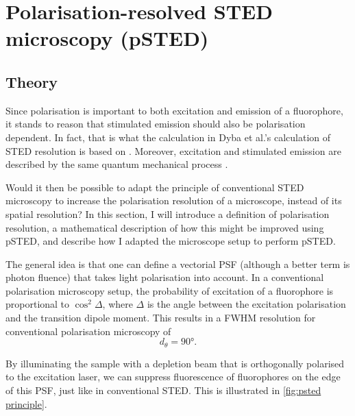 \section{Polarisation-resolved STED microscopy (pSTED)}
\subsection{Theory}
\label{sec:psted theory}

Since polarisation is important to both excitation and emission of a fluorophore, it stands to reason that stimulated emission should also be polarisation dependent. In fact, that is what the calculation in Dyba et al.'s calculation of STED resolution is based on \cite{Harke2008, Dyba2005}. Moreover, excitation and stimulated emission are described by the same quantum mechanical process \cite{Foot}.

Would it then be possible to adapt the principle of conventional STED microscopy to increase the polarisation resolution of a microscope, instead of its spatial resolution? In this section, I will introduce a definition of polarisation resolution, a mathematical description of how this might be improved using pSTED, and describe how I adapted the microscope setup to perform pSTED. 

The general idea is that one can define a vectorial PSF (although a better term is photon fluence) that takes light polarisation into account. In a conventional polarisation microscopy setup, the probability of excitation of a fluorophore is proportional to $ \cos^2 \Delta $, where $ \Delta $ is the angle between the excitation polarisation and the transition dipole moment. This results in a FWHM resolution for conventional polarisation microscopy of 
\begin{equation}
	d_\theta = \ang{90}.
\end{equation}

By illuminating the sample with a depletion beam that is orthogonally polarised to the excitation laser, we can suppress fluorescence of fluorophores on the edge of this PSF, just like in conventional STED. This is illustrated in \autoref{fig:psted principle}.

